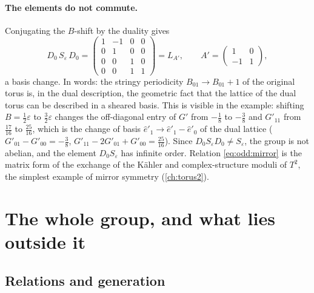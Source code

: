 \paragraph{The elements do not commute.} Conjugating the $B$-shift by the duality gives
\begin{equation}\label{eq:odd:mirror}
 D_0\,S_\varepsilon\,D_0=\begin{pmatrix}1&-1&0&0\\0&1&0&0\\0&0&1&0\\0&0&1&1\end{pmatrix}
 =L_{A'},\qquad A'=\begin{pmatrix}1&0\\-1&1\end{pmatrix},
\end{equation}
a basis change. In words: the stringy periodicity $B_{01}\to B_{01}+1$ of the original
torus is, in the dual description, the geometric fact that the lattice of the dual torus
can be described in a sheared basis. This is visible in the example: shifting
$B=\frac12\varepsilon$ to $\frac32\varepsilon$ changes the off-diagonal entry of $G'$ from
$-\frac18$ to $-\frac38$ and $G'_{11}$ from $\frac{17}{16}$ to $\frac{25}{16}$, which is
the change of basis $\hat e'_1\to\hat e'_1-\hat e'_0$ of the dual lattice
($G'_{01}-G'_{00}=-\frac38$, $G'_{11}-2G'_{01}+G'_{00}=\frac{25}{16}$). Since $D_0S_\varepsilon D_0\neq
S_\varepsilon$, the group is not abelian, and the element $D_0S_\varepsilon$ has infinite
order. Relation \eqref{eq:odd:mirror} is the matrix form of the exchange of the K\"ahler and
complex-structure moduli of $T^2$, the simplest example of mirror symmetry
(\cref{ch:torus2}).

\section{The whole group, and what lies outside it}\label{sec:odd:generation}

\subsection{Relations and generation}

